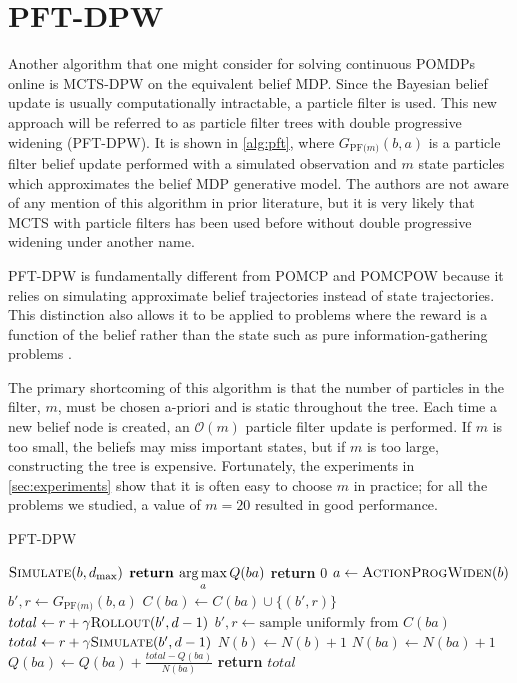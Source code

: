 \section{PFT-DPW}

Another algorithm that one might consider for solving continuous POMDPs online is MCTS-DPW on the equivalent belief MDP.
Since the Bayesian belief update is usually computationally intractable, a particle filter is used.
This new approach will be referred to as particle filter trees with double progressive widening (PFT-DPW).
It is shown in \cref{alg:pft}, where $G_\text{PF($m$)}(b,a)$ is a particle filter belief update performed with a simulated observation and $m$ state particles which approximates the belief MDP generative model.
The authors are not aware of any mention of this algorithm in prior literature, but it is very likely that MCTS with particle filters has been used before without double progressive widening under another name.

PFT-DPW is fundamentally different from POMCP and POMCPOW because it relies on simulating approximate belief trajectories instead of state trajectories.
This distinction also allows it to be applied to problems where the reward is a function of the belief rather than the state such as pure information-gathering problems \cite{dressel2017efficient,araya2010pomdp}.

The primary shortcoming of this algorithm is that the number of particles in the filter, $m$, must be chosen a-priori and is static throughout the tree.
Each time a new belief node is created, an $\mathcal{O}(m)$ particle filter update is performed.
If $m$ is too small, the beliefs may miss important states, but if $m$ is too large, constructing the tree is expensive.
Fortunately, the experiments in \cref{sec:experiments} show that it is often easy to choose $m$ in practice; for all the problems we studied, a value of $m=20$ resulted in good performance.


\begin{algorithm}
    \caption{PFT-DPW} \label{alg:pft}
    \begin{algorithmic}[1]
                \State $\Call{Simulate}{b, d_\text{max}}$
            \EndFor
            \State $\textbf{return } \underset{a}{\argmax}\, Q(ba)$
        \EndProcedure
                \State \textbf{return} $0$
            \EndIf
            \State $a \gets \Call{ActionProgWiden}{b}$
                \State $b',r \gets G_\text{PF($m$)}(b,a)$
                \State $C(ba) \gets C(ba) \cup \{(b',r)\}$
                \State $total \gets r + \gamma \Call{Rollout}{b', d-1}$
            \Else
                \State $b', r \gets \text{sample uniformly from } C(ba)$
                \State $total \gets r + \gamma \Call{Simulate}{b', d-1}$
            \EndIf
            \State $N(b) \gets N(b)+1$
            \State $N(ba) \gets N(ba)+1$
            \State $Q(ba) \gets Q(ba) + \frac{total - Q(ba)}{N(ba)}$
            \State \textbf{return} $total$
        \EndProcedure
    \end{algorithmic}
\end{algorithm}

